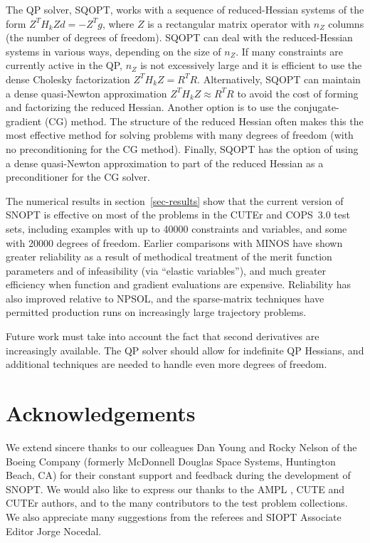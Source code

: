 \documentclass[draft,leqno,onefignum,onetabnum]{siamltex}
\def\T{^T\!}
\def\Z{_{\scriptscriptstyle Z}}
\def\AMPL  {{\small AMPL}}
\def\COPS  {{\small COPS}}
\def\CUTE  {{\small CUTE}}
\def\CUTEr {{\small CUTEr}}
\def\MINOS {{\small MINOS}}
\def\NPSOL {{\small NPSOL}}
\def\SNOPT {{\small SNOPT}}
\def\SQOPT {{\small SQOPT}}
\begin{document}
The QP solver, \SQOPT, works with a sequence of
reduced-Hessian systems of the form $Z\T H_k Z d = - Z\T g$,
where $Z$ is a rectangular matrix operator with $n\Z$ columns
(the number of degrees of freedom).  \SQOPT{} can deal with
the reduced-Hessian systems in various ways, depending on
the size of $n\Z$.  If many constraints are currently active
in the QP, $n\Z$ is not excessively large and it is
efficient to use the dense Cholesky factorization $Z\T H_k Z = R\T R$.
Alternatively, \SQOPT{} can maintain a dense
quasi-Newton approximation $Z\T H_k Z \approx R\T R$ to
avoid the cost of forming and factorizing the reduced
Hessian.  Another option is to use the conjugate-gradient
(CG) method.  The structure of the
reduced Hessian often makes this the most effective
method for solving problems with many degrees of freedom
(with no preconditioning for the CG method).  Finally,
\SQOPT{} has the option of using a dense quasi-Newton
approximation to part of the reduced Hessian as a
preconditioner for the CG solver.

The numerical results in section~\ref{sec-results} show that
the current version of \SNOPT{} is effective on most of the
problems in the \CUTEr{} and \COPS~3.0 test sets, including
examples with up to 40000 constraints and variables, and
some with 20000 degrees of freedom.  Earlier comparisons
with \MINOS{} have shown greater reliability as a result of
methodical treatment of the merit function parameters and of
infeasibility (via ``elastic variables''), and much greater
efficiency when function and gradient evaluations are
expensive.  Reliability has also improved relative to
\NPSOL, and the sparse-matrix techniques have permitted
production runs on increasingly large trajectory
problems.

Future work must take into account the fact that second
derivatives are increasingly available.  The QP solver should
allow for indefinite QP Hessians, and additional techniques
are needed to handle even more degrees of freedom.



\section*{Acknowledgements}

We extend sincere thanks to our colleagues Dan Young and Rocky Nelson
of the Boeing Company (formerly McDonnell Douglas Space Systems,
Huntington Beach, CA) for their constant support and feedback during
the development of \SNOPT{}\@.   We would also
like to express our thanks to the \AMPL{} \cite{AMPL2}, \CUTE{}
\cite{BonCGT95} and \CUTEr{} \cite{GouOT03} authors, and to the many
contributors to the test problem collections.
We also appreciate many suggestions
from the referees and SIOPT Associate Editor Jorge Nocedal.




\end{document}
